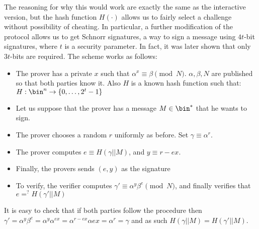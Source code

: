 \documentclass{article}
\begin{document}
The reasoning for why this would work are exactly the same as the interactive version, but the hash function 
$H(\cdot)$ allows us to fairly select a challenge without possibility of cheating. In particular, a further 
modification of the protocol allows us to get Schnorr signatures, a way to sign a message using $4t$-bit signatures,
where $t$ is a security parameter. In fact, it was later shown \cite{nevenHashFunctionRequirements2009} that only $3t$-bits 
are required. The scheme works as follows:
\begin{itemize}
    \item The prover has a private $x$ such that $\alpha^x \equiv \beta \pmod N$. $\alpha, \beta, N$ 
          are published so that both parties know it. Also $H$ is a known hash function such that: $H: \bin^n \to \{0, \dots, 2^t - 1\}$
    \item Let us suppose that the prover has a message $M \in \bin^*$ that he wants to sign. 
    \item The prover chooses a random $r$ uniformly as before. Set $\gamma \equiv \alpha^r$.
    \item The prover computes $e \equiv H(\gamma || M)$, and $y \equiv r - ex$.
    \item Finally, the provers sends $(e, y)$ as the signature
    \item To verify, the verifier computes $\gamma' \equiv \alpha^y \beta^e \pmod N$, and finally 
          verifies that $e =^? H(\gamma' || M)$
\end{itemize}

It is easy to check that if both parties follow the procedure then 
$\gamma' = \alpha^y \beta ^e = \alpha^y \alpha^{ex} = \alpha^{r - ex} \alpha{ex} = \alpha^r = \gamma$
and as such $H(\gamma || M) = H(\gamma' || M)$.
\end{document}
